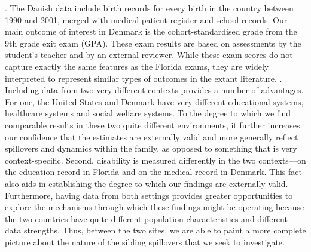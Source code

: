 {.
The Danish data include birth records for every birth in the country between 1990 and 2001, merged with medical patient register and school records. Our main outcome of interest in Denmark is the cohort-standardised grade from the 9th grade exit exam (GPA). These exam results are based on assessments by the student’s teacher and by an external reviewer. While these exam scores do not capture exactly the same features as the Florida exams, they are widely interpreted to represent similar types of outcomes in the extant literature.
.
Including data from two very different contexts provides a number of advantages. For one, the United States and Denmark have very different educational systems, healthcare systems and social welfare systems. To the degree to which we find comparable results in these two quite different environments, it further increases our confidence that the estimates are externally valid and more generally reflect spillovers and dynamics within the family, as opposed to something that is very context-specific. Second, disability is measured differently in the two contexts—on the education record in Florida and on the medical record in Denmark. This fact also aids in establishing the degree to which our findings are externally valid. Furthermore, having data from both settings provides greater opportunities to explore the mechanisms through which these findings might be operating because the two countries have quite different population characteristics and different data strengths. Thus, between the two sites, we are able to paint a more complete picture about the nature of the sibling spillovers that we seek to investigate.}




